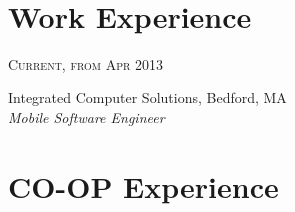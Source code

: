 \documentclass[10pt]{article} %
\begin{document}
\color{text1} %


\par{\\ %
	

\begin{minipage}[t]{0.5\textwidth} %
\vspace{0pt} %
	

\section{Work Experience} 


{\raggedleft\textsc{Current, from Apr 2013}\par}

{\raggedright\large Integrated Computer Solutions, Bedford, MA\\
\textit{Mobile Software Engineer}\\[5pt]}






\section{CO-OP Experience} 


\end{minipage}}
\end{document}
